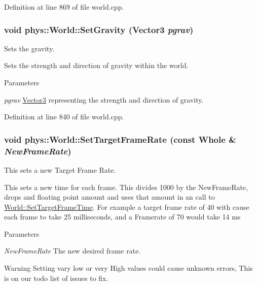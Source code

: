 Definition at line 869 of file world.cpp.

\hypertarget{classphys_1_1World_a47e1221b296ea7c3188da65ca9570bd5}{
\subsubsection[{SetGravity}]{\setlength{\rightskip}{0pt plus 5cm}void phys::World::SetGravity ({\bf Vector3} {\em pgrav})}}
\label{da/ddf/classphys_1_1World_a47e1221b296ea7c3188da65ca9570bd5}


Sets the gravity. 

Sets the strength and direction of gravity within the world. 
\begin{DoxyParams}{Parameters}
\item[{\em pgrav}]\hyperlink{classphys_1_1Vector3}{Vector3} representing the strength and direction of gravity. \end{DoxyParams}


Definition at line 840 of file world.cpp.

\hypertarget{classphys_1_1World_a76dfcde35392291aafd6eb1a64b3c95c}{
\subsubsection[{SetTargetFrameRate}]{\setlength{\rightskip}{0pt plus 5cm}void phys::World::SetTargetFrameRate (const {\bf Whole} \& {\em NewFrameRate})}}
\label{da/ddf/classphys_1_1World_a76dfcde35392291aafd6eb1a64b3c95c}


This sets a new Target Frame Rate. 

This sets a new time for each frame. This divides 1000 by the NewFrameRate, drops and floating point amount and uses that amount in an call to \hyperlink{classphys_1_1World_ad95b5a5ad73e0a05826b5bd834876333}{World::SetTargetFrameTime}. For example a target frame rate of 40 with cause each frame to take 25 milliseconds, and a Framerate of 70 would take 14 ms 
\begin{DoxyParams}{Parameters}
\item[{\em NewFrameRate}]The new desired frame rate. \end{DoxyParams}
\begin{DoxyWarning}{Warning}
Setting vary low or very High values could cause unknown errors, This is on our todo list of issues to fix. 
\end{DoxyWarning}


